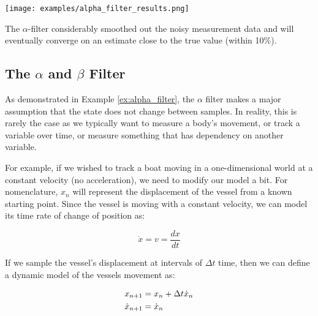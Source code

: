 \begin{example}
\begin{center}
\begin{tabular}{c | c | c | c | c}
            \bottomrule
            \end{tabular}
        \end{center}

        \begin{center}
            \texttt{[image: examples/alpha\_filter\_results.png]}
        \end{center}

        The $\alpha$-filter considerably smoothed out the noisy measurement data and will eventually converge on an estimate close to the true value (within 10\%).

        \end{example}


        \subsection{The $\alpha$ and $\beta$ Filter}
        As demonstrated in Example \ref{ex:alpha_filter}, the $\alpha$ filter makes a major assumption that the state does not change between samples.
        In reality, this is rarely the case as we typically want to measure a body's movement, or track a variable over time, or measure something that has dependency on another variable.
        
        For example, if we wished to track a boat moving in a one-dimensional world at a constant velocity (no acceleration), we need to modify our model a bit.
        For nomenclature, $x_n$ will represent the displacement of the vessel from a known starting point.
        Since the vessel is moving with a constant velocity, we can model its time rate of change of position as:
        
        \begin{equation*}
            \dot{x} = v = \frac{dx}{dt}
        \end{equation*}

        If we sample the vessel's displacement at intervals of $\Delta t$ time, then we can define a dynamic model of the vessels movement as:

        \begin{subequations}
            \labeq{see_dynamic_model}
            \begin{align}
                x_{n+1} &= x_n + \Delta t \dot{x}_n \labeq{see_disp}\\
                \dot{x}_{n+1} &= \dot{x}_n \labeq{see_velocity}
            \end{align}
        \end{subequations}

